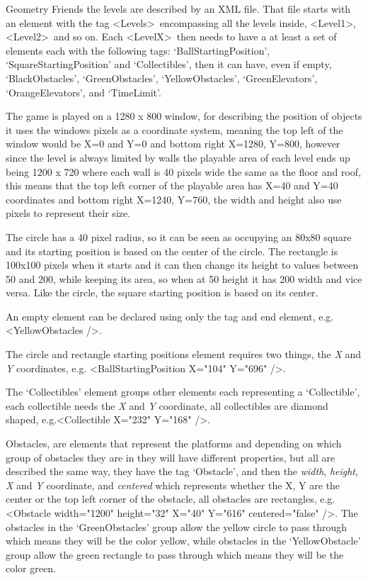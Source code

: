 \documentclass[runningheads]{llncs}
\begin{document}
Geometry Friends the levels are described by an XML file. That file starts with an element with the tag \textless Levels\textgreater~encompassing all the levels inside, \textless Level1\textgreater , \textless Level2\textgreater~and so on. Each \textless LevelX\textgreater~then needs to have a  at least a set of elements each with the following tags: `BallStartingPosition', `SquareStartingPosition' and `Collectibles', then it can have, even if empty, `BlackObstacles', `GreenObstacles', `YellowObstacles', `GreenElevators', `OrangeElevators', and `TimeLimit'.

The game is played on a 1280 x 800 window, for describing the position of objects it uses the windows pixels as a coordinate system, meaning the top left of the window would be X=0 and Y=0 and bottom right X=1280, Y=800, however since the level is always limited by walls the playable area of each level ends up being 1200 x 720 where each wall is 40 pixels wide the same as the floor and roof, this means that the top left corner of the playable area has X=40 and Y=40 coordinates and bottom right X=1240, Y=760, the width and height also use pixels to represent their size.

The circle has a 40 pixel radius, so it can be seen as occupying an 80x80 square and its starting position is based on the center of the circle. The rectangle is 100x100 pixels when it starts and it can then change its height to values between 50 and 200, while keeping its area, so when at 50 height it has 200 width and vice versa. Like the circle, the square starting position is based on its center.

An empty element can be declared using only the tag and end element, e.g. \textless YellowObstacles /\textgreater.

The circle and rectangle starting positions element requires two things, the \textit{X} and \textit{Y} coordinates, e.g. \textless BallStartingPosition X="104" Y="696" /\textgreater.

The `Collectibles' element groups other elements each representing a `Collectible', each collectible needs the \textit{X} and \textit{Y} coordinate, all collectibles are diamond shaped, e.g.\textless Collectible X="232" Y="168" /\textgreater.

Obstacles, are elements that represent the platforms and depending on which group of obstacles they are in they will have different properties, but all are described the same way, they have the tag `Obstacle', and then the \textit{width}, \textit{height}, \textit{X} and \textit{Y} coordinate, and \textit{centered} which represents whether the X, Y are the center or the top left corner of the obstacle, all obstacles are rectangles, e.g. \textless Obstacle width="1200" height="32" X="40" Y="616" centered="false" /\textgreater. The obstacles in the `GreenObstacles' group allow the yellow circle to pass through which means they will be the color yellow, while obstacles in the `YellowObstacle' group allow the green rectangle to pass through which means they will be the color green.
\end{document}
